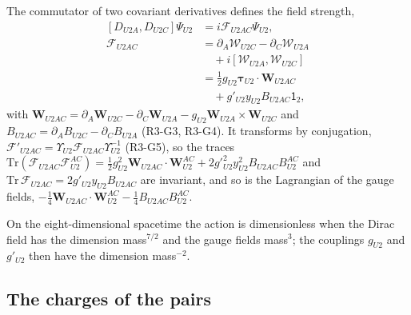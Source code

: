 The commutator of two covariant derivatives defines the field strength,
\begin{equation}
\begin{aligned}
[D_{U2A},D_{U2C}]\Psi_{U2}&=i\mathcal F_{U2AC}\Psi_{U2},\\
\mathcal F_{U2AC}&=\partial_A\mathcal W_{U2C}-\partial_C\mathcal W_{U2A}\\
&\quad+i[\mathcal W_{U2A},\mathcal W_{U2C}]\\
&=\tfrac12g_{U2}\boldsymbol\tau_{U2}\cdot\boldsymbol W_{U2AC}\\
&\quad+g'_{U2}y_{U2}B_{U2AC}\mathsf 1_2,
\end{aligned}
\label{eq:F}
\end{equation}
with $\boldsymbol W_{U2AC}=\partial_A\boldsymbol W_{U2C}-\partial_C\boldsymbol W_{U2A}-g_{U2}\boldsymbol
W_{U2A}\times\boldsymbol W_{U2C}$ and $B_{U2AC}=\partial_AB_{U2C}-\partial_CB_{U2A}$ (R3-G3, R3-G4).
It transforms by conjugation, $\mathcal F'_{U2AC}=\Upsilon_{U2}\mathcal F_{U2AC}\Upsilon^{-1}_{U2}$
(R3-G5), so the traces $\mathrm{Tr}(\mathcal F_{U2AC}\mathcal F^{AC}_{U2})=\tfrac12g_{U2}^2
\boldsymbol W_{U2AC}\cdot\boldsymbol W^{AC}_{U2}+2g'^2_{U2}y_{U2}^2B_{U2AC}B^{AC}_{U2}$ and
$\mathrm{Tr}\,\mathcal F_{U2AC}=2g'_{U2}y_{U2}B_{U2AC}$ are invariant, and so is the Lagrangian of
the gauge fields, $-\tfrac14\boldsymbol W_{U2AC}\cdot\boldsymbol W^{AC}_{U2}-\tfrac14B_{U2AC}B^{AC}_{U2}$.

On the eight-dimensional spacetime the action is dimensionless when the Dirac field has the
dimension mass$^{7/2}$ and the gauge fields mass$^{3}$; the couplings $g_{U2}$ and $g'_{U2}$ then
have the dimension mass$^{-2}$.

\subsection{The charges of the pairs}

